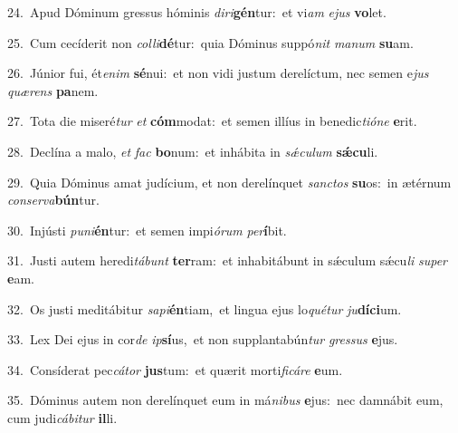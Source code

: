 {\numbfont\textcolor{\numbcolor}{24.}}~Apud Dóminum gressus hóminis \textit{di}\-\textit{ri}\textbf{gén}tur:~\star et vi\textit{am} \textit{e}\-\textit{jus} \textbf{vo}\-let.\par
{\numbfont\textcolor{\numbcolor}{25.}}~Cum cecíderit non \textit{col}\-\textit{li}\textbf{dé}tur:~\star quia Dóminus suppó\textit{nit} \textit{ma}\-\textit{num} \textbf{su}\-am.\par
{\numbfont\textcolor{\numbcolor}{26.}}~Júnior fui, ét\-\textit{e}\-\textit{nim} \textbf{sé}\-nui:~\star et non vidi justum derelíctum, nec semen e\textit{jus} \textit{quæ}\-\textit{rens} \textbf{pa}\-nem.\par
{\numbfont\textcolor{\numbcolor}{27.}}~Tota die miseré\textit{tur} \textit{et} \textbf{cóm}\-modat:~\star et semen illíus in benedic\-\textit{ti}\-\textit{ó}\textit{ne} \textbf{e}\-rit.\par
{\numbfont\textcolor{\numbcolor}{28.}}~Declína a malo, \textit{et} \textit{fac} \textbf{bo}\-num:~\star et inhábita in \textit{sǽ}\-\textit{cu}\textit{lum} \textbf{sǽ}\-\textbf{cu}li.\par
{\numbfont\textcolor{\numbcolor}{29.}}~Quia Dóminus amat judícium, et non derelínquet \textit{sanc}\-\textit{tos} \textbf{su}\-os:~\star in ætérnum \textit{con}\-\textit{ser}\textit{va}\textbf{bún}tur.\par
{\numbfont\textcolor{\numbcolor}{30.}}~Injústi \textit{pu}\-\textit{ni}\textbf{én}tur:~\star et semen impi\-\textit{ó}\-\textit{rum} \textit{per}\-\textbf{í}bit.\par
{\numbfont\textcolor{\numbcolor}{31.}}~Justi autem heredi\-\textit{tá}\-\textit{bunt} \textbf{ter}\-ram:~\star et inhabitábunt in sǽculum sǽcu\textit{li} \textit{su}\-\textit{per} \textbf{e}\-am.\par
{\numbfont\textcolor{\numbcolor}{32.}}~Os justi meditábitur \textit{sa}\-\textit{pi}\textbf{én}tiam,~\star et lingua ejus lo\-\textit{qué}\-\textit{tur} \textit{ju}\-\textbf{dí}\textbf{ci}um.\par
{\numbfont\textcolor{\numbcolor}{33.}}~Lex Dei ejus in cor\textit{de} \textit{ip}\-\textbf{sí}us,~\star et non supplantabún\textit{tur} \textit{gres}\-\textit{sus} \textbf{e}\-jus.\par
{\numbfont\textcolor{\numbcolor}{34.}}~Consíderat pec\-\textit{cá}\-\textit{tor} \textbf{jus}\-tum:~\star et quærit morti\-\textit{fi}\-\textit{cá}\textit{re} \textbf{e}\-um.\par
{\numbfont\textcolor{\numbcolor}{35.}}~Dóminus autem non derelínquet eum in má\-\textit{ni}\-\textit{bus} \textbf{e}\-jus:~\star nec damnábit eum, cum judi\-\textit{cá}\-\textit{bi}\textit{tur} \textbf{il}\-li.\par
